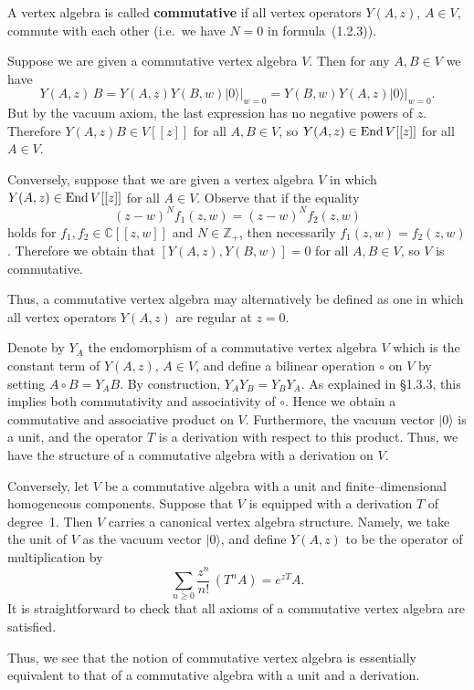 \documentclass[12pt]{article}
\begin{document}
\begin{example}
A vertex algebra is called \textbf{commutative} if all vertex operators 
$Y(A,z)$, $A \in V$, commute with each other (i.e.\ we have $N=0$ in formula~(1.2.3)).

Suppose we are given a commutative vertex algebra $V$. 
Then for any $A,B \in V$ we have
\[
Y(A,z)\,B = Y(A,z)Y(B,w)\lvert 0 \rangle\big|_{w=0}
= Y(B,w)Y(A,z)\lvert 0 \rangle\big|_{w=0}.
\]
But by the vacuum axiom, the last expression has no negative powers of $z$. 
Therefore $Y(A,z)B \in V[[z]]$ for all $A,B \in V$, 
so $Y(A,z) \in \operatorname{End} V[[z]]$ for all $A \in V$.

Conversely, suppose that we are given a vertex algebra $V$ in which 
$Y(A,z) \in \operatorname{End} V[[z]]$ for all $A \in V$.  
Observe that if the equality 
\[
(z-w)^N f_1(z,w) = (z-w)^N f_2(z,w)
\]
holds for $f_1,f_2 \in \mathbb{C}[[z,w]]$ and $N \in \mathbb{Z}_+$, 
then necessarily $f_1(z,w) = f_2(z,w)$.  
Therefore we obtain that $[Y(A,z),Y(B,w)] = 0$ for all $A,B \in V$, 
so $V$ is commutative.

Thus, a commutative vertex algebra may alternatively be defined as one 
in which all vertex operators $Y(A,z)$ are regular at $z=0$.

\medskip

Denote by $Y_A$ the endomorphism of a commutative vertex algebra $V$ 
which is the constant term of $Y(A,z)$, $A \in V$, and define a bilinear 
operation $\circ$ on $V$ by setting $A \circ B = Y_A B$.  
By construction, $Y_A Y_B = Y_B Y_A$.  
As explained in \S1.3.3, this implies both commutativity and associativity 
of $\circ$.  
Hence we obtain a commutative and associative product on $V$.  
Furthermore, the vacuum vector $\lvert 0 \rangle$ is a unit, 
and the operator $T$ is a derivation with respect to this product.  
Thus, we have the structure of a commutative algebra with a derivation on $V$.

\medskip

Conversely, let $V$ be a commutative algebra with a unit and 
finite–dimensional homogeneous components.  
Suppose that $V$ is equipped with a derivation $T$ of degree~1.  
Then $V$ carries a canonical vertex algebra structure.  
Namely, we take the unit of $V$ as the vacuum vector $\lvert 0 \rangle$, 
and define $Y(A,z)$ to be the operator of multiplication by
\[
\sum_{n \ge 0} \frac{z^n}{n!}\,(T^n A) = e^{zT}A.
\]
It is straightforward to check that all axioms of a commutative vertex algebra 
are satisfied.

\medskip

Thus, we see that the notion of commutative vertex algebra is essentially 
equivalent to that of a commutative algebra with a unit and a derivation.
\end{example}
\end{document}
